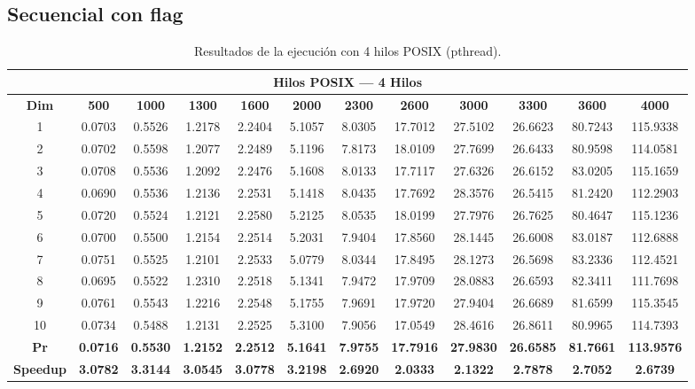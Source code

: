 \documentclass{article}
\begin{document}

\subsection{Secuencial con flag}

\begin{table}[H]
\centering
\tiny
\begin{tabular}{|c|c|c|c|c|c|c|c|c|c|c|c|}
\hline
\multicolumn{12}{|c|}{\textbf{Hilos POSIX --- 4 Hilos}} \\
\hline
\textbf{Dim} & \textbf{500} & \textbf{1000} & \textbf{1300} & \textbf{1600} & \textbf{2000} & \textbf{2300} & \textbf{2600} & \textbf{3000} & \textbf{3300} & \textbf{3600} & \textbf{4000} \\
\hline
1  & 0.0703 & 0.5526 & 1.2178 & 2.2404 & 5.1057 & 8.0305 & 17.7012 & 27.5102 & 26.6623 & 80.7243 & 115.9338 \\
2  & 0.0702 & 0.5598 & 1.2077 & 2.2489 & 5.1196 & 7.8173 & 18.0109 & 27.7699 & 26.6433 & 80.9598 & 114.0581 \\
3  & 0.0708 & 0.5536 & 1.2092 & 2.2476 & 5.1608 & 8.0133 & 17.7117 & 27.6326 & 26.6152 & 83.0205 & 115.1659 \\
4  & 0.0690 & 0.5536 & 1.2136 & 2.2531 & 5.1418 & 8.0435 & 17.7692 & 28.3576 & 26.5415 & 81.2420 & 112.2903 \\
5  & 0.0720 & 0.5524 & 1.2121 & 2.2580 & 5.2125 & 8.0535 & 18.0199 & 27.7976 & 26.7625 & 80.4647 & 115.1236 \\
6  & 0.0700 & 0.5500 & 1.2154 & 2.2514 & 5.2031 & 7.9404 & 17.8560 & 28.1445 & 26.6008 & 83.0187 & 112.6888 \\
7  & 0.0751 & 0.5525 & 1.2101 & 2.2533 & 5.0779 & 8.0344 & 17.8495 & 28.1273 & 26.5698 & 83.2336 & 112.4521 \\
8  & 0.0695 & 0.5522 & 1.2310 & 2.2518 & 5.1341 & 7.9472 & 17.9709 & 28.0883 & 26.6593 & 82.3411 & 111.7698 \\
9  & 0.0761 & 0.5543 & 1.2216 & 2.2548 & 5.1755 & 7.9691 & 17.9720 & 27.9404 & 26.6689 & 81.6599 & 115.3545 \\
10 & 0.0734 & 0.5488 & 1.2131 & 2.2525 & 5.3100 & 7.9056 & 17.0549 & 28.4616 & 26.8611 & 80.9965 & 114.7393 \\
\hline
\textbf{Pr} & \textbf{0.0716} & \textbf{0.5530} & \textbf{1.2152} & \textbf{2.2512} & \textbf{5.1641} & \textbf{7.9755} & \textbf{17.7916} & \textbf{27.9830} & \textbf{26.6585} & \textbf{81.7661} & \textbf{113.9576} \\
\hline
\textbf{Speedup} & \textbf{3.0782} & \textbf{3.3144} & \textbf{3.0545} & \textbf{3.0778} & \textbf{3.2198} & \textbf{2.6920} & \textbf{2.0333} & \textbf{2.1322} & \textbf{2.7878} & \textbf{2.7052} & \textbf{2.6739} \\
\hline
\end{tabular}
\label{tab:t4}
\caption{Resultados de la ejecución con 4 hilos POSIX (pthread).}
\end{table}
\end{document}
